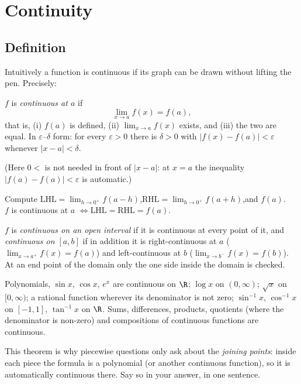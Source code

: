 \section{Continuity}\label{sec:lim-cont}

\subsection{Definition}
Intuitively a function is continuous if its graph can be drawn without lifting the pen. Precisely:
\begin{definition}
$f$ is \emph{continuous at $a$} if
\[
\lim_{x\to a}f(x)=f(a),
\]
that is, (i) $f(a)$ is defined, (ii) $\lim_{x\to a}f(x)$ exists, and (iii) the two are equal. In $\varepsilon$--$\delta$ form: for every $\varepsilon>0$ there is $\delta>0$ with $|f(x)-f(a)|<\varepsilon$ whenever $|x-a|<\delta$.
\end{definition}
(Here $0<$ is not needed in front of $|x-a|$: at $x=a$ the inequality $|f(a)-f(a)|<\varepsilon$ is automatic.)

\begin{keybox}
Compute \quad $\text{LHL}=\lim_{h\to0^+}f(a-h)$,\quad $\text{RHL}=\lim_{h\to0^+}f(a+h)$,\quad and $f(a)$.\\[3pt]
$f$ is continuous at $a$ \quad$\iff$\quad $\text{LHL}=\text{RHL}=f(a)$.
\end{keybox}
$f$ is \emph{continuous on an open interval} if it is continuous at every point of it, and \emph{continuous on $[a,b]$} if in addition it is right-continuous at $a$ ($\lim_{x\to a^+}f(x)=f(a)$) and left-continuous at $b$ ($\lim_{x\to b^-}f(x)=f(b)$). At an end point of the domain only the one side inside the domain is checked.

\begin{theorem}
Polynomials, $\sin x$, $\cos x$, $e^x$ are continuous on $\R$; $\log x$ on $(0,\infty)$; $\sqrt x$ on $[0,\infty)$; a rational function wherever its denominator is not zero; $\sin^{-1}x$, $\cos^{-1}x$ on $[-1,1]$, $\tan^{-1}x$ on $\R$. Sums, differences, products, quotients (where the denominator is non-zero) and compositions of continuous functions are continuous.
\end{theorem}
This theorem is why piecewise questions only ask about the \emph{joining points}: inside each piece the formula is a polynomial (or another continuous function), so it is automatically continuous there. Say so in your answer, in one sentence.

